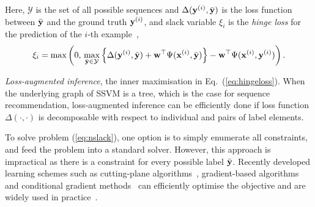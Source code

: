 Here, 
$\mathcal{Y}$ is the set of all possible sequences
and $\Delta(\mathbf{y}^{(i)}, \bar{\mathbf{y}})$ is the loss function between $\bar{\mathbf{y}}$ and the ground truth $\mathbf{y}^{(i)}$,
and slack variable $\xi_i$ is the \emph{hinge loss} for the prediction of the $i$-th example~\cite{tsochantaridis2005large},
\begin{equation}
\label{eq:hingeloss}
\xi_i = \max \left( 0, \, 
        \max_{\bar{\mathbf{y}} \in \mathcal{Y}}
        \left\{ \Delta(\mathbf{y}^{(i)}, \bar{\mathbf{y}}) + \mathbf{w}^\top \Psi(\mathbf{x}^{(i)}, \bar{\mathbf{y}}) \right\} - \mathbf{w}^\top \Psi(\mathbf{x}^{(i)}, \mathbf{y}^{(i)}) \right).
\end{equation}

\emph{Loss-augmented inference}, \ie the inner maximisation in Eq.~(\ref{eq:hingeloss}).
When the underlying graph of SSVM is a tree, which is the case for sequence recommendation, 
loss-augmented inference can be efficiently done if loss function $\Delta(\cdot,\cdot)$ is decomposable
with respect to individual and pairs of label elements.

To solve problem (\ref{eq:nslack}), one option is to simply enumerate all constraints, and feed the problem into a standard solver.
However, this approach is impractical as there is a constraint for every possible label $\bar{\mathbf{y}}$.
Recently developed learning schemes such as 
cutting-plane algorithms~\cite{joachims2009predicting}, %
gradient-based algorithms~\cite{ratliff2006subgradient} %
and conditional gradient methods~\cite{lacoste2013block} %
can efficiently optimise the objective and are widely used in practice~\cite{muller2014methods}.

